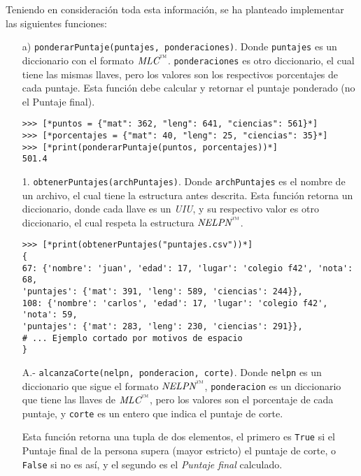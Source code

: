 Teniendo en consideración toda esta información, se ha planteado implementar las siguientes funciones:
\begin{enumerate}
    \item[a)] \texttt{ponderarPuntaje(puntajes, ponderaciones)}. Donde \texttt{puntajes} es un diccionario con el formato $\textit{MLC}^\text{\texttrademark}$. \texttt{ponderaciones} es otro diccionario, el cual tiene las mismas llaves, pero los valores son los respectivos porcentajes de cada puntaje. Esta función debe calcular y retornar el puntaje ponderado (no el Puntaje final).

\begin{lstlisting}[style=consola]
>>> [*puntos = {"mat": 362, "leng": 641, "ciencias": 561}*]
>>> [*porcentajes = {"mat": 40, "leng": 25, "ciencias": 35}*]
>>> [*print(ponderarPuntaje(puntos, porcentajes))*]
501.4
\end{lstlisting}

    \item[1.] \texttt{obtenerPuntajes(archPuntajes)}. Donde \texttt{archPuntajes} es el nombre de un archivo, el cual tiene la estructura antes descrita. Esta función retorna un diccionario, donde cada llave es un \textit{UIU}, y su respectivo valor es otro diccionario, el cual respeta la estructura $\textit{NELPN}^\text{\texttrademark}$.
    
\begin{lstlisting}[style=consola]
>>> [*print(obtenerPuntajes("puntajes.csv"))*]
{
67: {'nombre': 'juan', 'edad': 17, 'lugar': 'colegio f42', 'nota': 68, 
'puntajes': {'mat': 391, 'leng': 589, 'ciencias': 244}}, 
108: {'nombre': 'carlos', 'edad': 17, 'lugar': 'colegio f42', 'nota': 59, 
'puntajes': {'mat': 283, 'leng': 230, 'ciencias': 291}}, 
# ... Ejemplo cortado por motivos de espacio
}
\end{lstlisting}

    
    \item[A.-] \texttt{alcanzaCorte(nelpn, ponderacion, corte)}. Donde \texttt{nelpn} es un diccionario que sigue el formato $\textit{NELPN}^\text{\texttrademark}$, \texttt{ponderacion} es un diccionario que tiene las llaves de $\textit{MLC}^\text{\texttrademark}$, pero los valores son el porcentaje de cada puntaje, y \texttt{corte} es un entero que indica el puntaje de corte.
    
    Esta función retorna una tupla de dos elementos, el primero es \texttt{True} si el Puntaje final de la persona supera (mayor estricto) el puntaje de corte, o \texttt{False} si no es así, y el segundo es el \textit{Puntaje final} calculado.
    


\end{enumerate}
